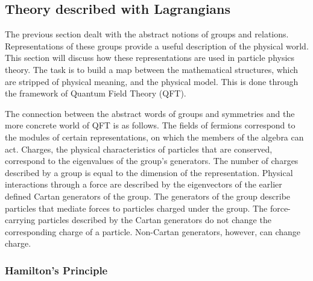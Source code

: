 \subsection{Theory described with Lagrangians}\label{sec:smMath}

The previous section dealt with the abstract notions of groups and relations.
Representations of these groups provide a useful description of the physical world.
This section will discuss how these representations are used in particle physics theory.
The task is to build a map between the mathematical structures, which are stripped of physical meaning, and the physical model.
This is done through the framework of Quantum Field Theory (QFT).

The connection between the abstract words of groups and symmetries and the more concrete world of QFT is as follows.
The fields of fermions correspond to the modules of certain representations, on which the members of the algebra can act.
Charges, the physical characteristics of particles that are conserved, correspond to the eigenvalues of the group's generators.
The number of charges described by a group is equal to the dimension of the representation.
Physical interactions through a force are described by the eigenvectors of the earlier defined Cartan generators of the group.
The generators of the group describe particles that mediate forces to particles charged under the group.
The force-carrying particles described by the Cartan generators do not change the corresponding charge of a particle.
Non-Cartan generators, however, can change charge.

\subsubsection{Hamilton's Principle}\label{sec:lagrangian}

